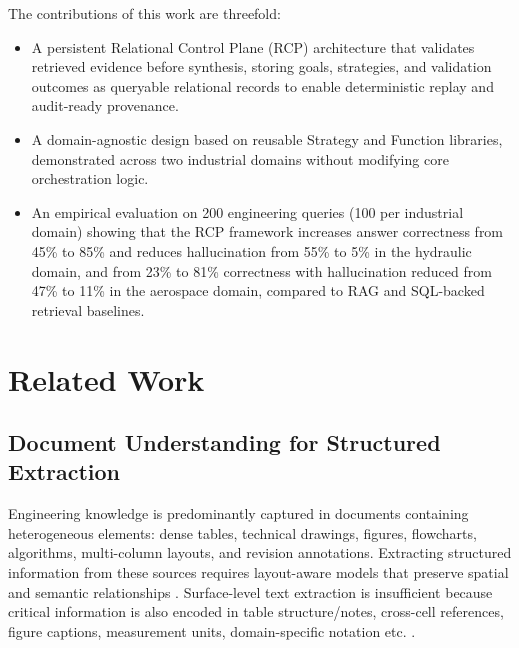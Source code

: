 \documentclass[largeformat]{interact}
\begin{document}
\vspace{1em}
\noindent The contributions of this work are threefold:
\begin{itemize}[label=-]
    \item A persistent Relational Control Plane (RCP) architecture that validates retrieved evidence before synthesis, storing goals, strategies, and validation outcomes as queryable relational records to enable deterministic replay and audit-ready provenance.
    \item A domain-agnostic design based on reusable Strategy and Function libraries, demonstrated across two industrial domains without modifying core orchestration logic.
    \item An empirical evaluation on 200 engineering queries (100 per industrial domain) showing that the RCP framework increases answer correctness from 45\% to 85\% and reduces hallucination from 55\% to 5\% in the hydraulic domain, and from 23\% to 81\% correctness with hallucination reduced from 47\% to 11\% in the aerospace domain, compared to RAG and SQL-backed retrieval baselines.
\end{itemize}

\section{Related Work}
\label{sec:related_work}

\subsection{Document Understanding for Structured Extraction}
\label{sec:document_understanding}
Engineering knowledge is predominantly captured in documents containing heterogeneous elements: dense tables, technical drawings, figures, flowcharts, algorithms, multi-column layouts, and revision annotations. Extracting structured information from these sources requires layout-aware models that preserve spatial and semantic relationships \cite{zhang2025doc}. Surface-level text extraction is insufficient because critical information is also encoded in table structure/notes, cross-cell references, figure captions, measurement units, domain-specific notation etc. \cite{guo2026dtbench, foppiano2019}.
\end{document}
